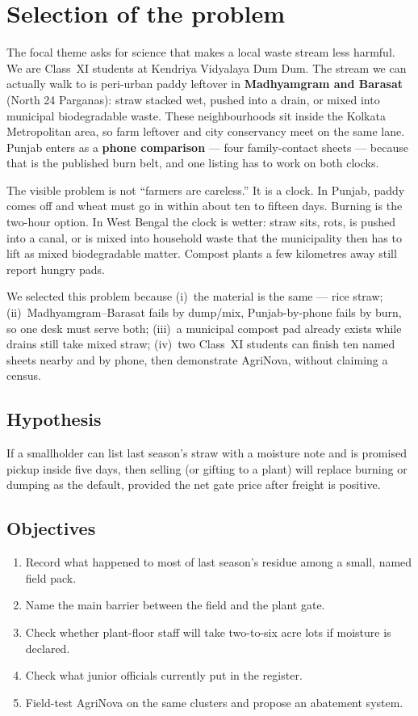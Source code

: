 \documentclass[12pt,a4paper]{article}
\begin{document}
\section{Selection of the problem}
The focal theme asks for science that makes a local waste stream less harmful. We are Class~XI students at Kendriya Vidyalaya Dum Dum. The stream we can actually walk to is peri-urban paddy leftover in \textbf{Madhyamgram and Barasat} (North 24 Parganas): straw stacked wet, pushed into a drain, or mixed into municipal biodegradable waste. These neighbourhoods sit inside the Kolkata Metropolitan area, so farm leftover and city conservancy meet on the same lane. Punjab enters as a \textbf{phone comparison} --- four family-contact sheets --- because that is the published burn belt, and one listing has to work on both clocks.

The visible problem is not ``farmers are careless.'' It is a clock. In Punjab, paddy comes off and wheat must go in within about ten to fifteen days. Burning is the two-hour option. In West Bengal the clock is wetter: straw sits, rots, is pushed into a canal, or is mixed into household waste that the municipality then has to lift as mixed biodegradable matter. Compost plants a few kilometres away still report hungry pads.

We selected this problem because (i)~the material is the same --- rice straw; (ii)~Madhyamgram--Barasat fails by dump/mix, Punjab-by-phone fails by burn, so one desk must serve both; (iii)~a municipal compost pad already exists while drains still take mixed straw; (iv)~two Class~XI students can finish ten named sheets nearby and by phone, then demonstrate AgriNova, without claiming a census.

\subsection{Hypothesis}
If a smallholder can list last season's straw with a moisture note and is promised pickup inside five days, then selling (or gifting to a plant) will replace burning or dumping as the default, provided the net gate price after freight is positive.

\subsection{Objectives}
\begin{enumerate}[leftmargin=1.4em]
  \item Record what happened to most of last season's residue among a small, named field pack.
  \item Name the main barrier between the field and the plant gate.
  \item Check whether plant-floor staff will take two-to-six acre lots if moisture is declared.
  \item Check what junior officials currently put in the register.
  \item Field-test AgriNova on the same clusters and propose an abatement system.
\end{enumerate}
\end{document}
